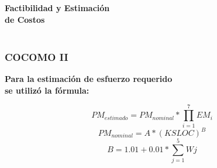\documentclass[xcolor=dvipsnames, xcolor=table]{beamer}
\begin{document}
\begin{frame}
    \centering\color{color3}{\rule{10cm}{5pt}}\\
    \vspace{-3mm}
    \centering\color{color3}{\rule{10cm}{1.5pt}}\\
    \vspace{2mm}
    \centering\textbf{\huge{\textcolor{color1}{Factibilidad y Estimación\\ de Costos}}}\\
    \centering\color{color3}{\rule{10cm}{1.5pt}}\\
\end{frame}

\begin{frame}
    \frametitle{COCOMO II}
    \centering\textbf{\textcolor{color3}{Para la estimación de esfuerzo requerido\\se utilizó la fórmula:}}

\[PM_{estimado} = PM_{nominal} * \prod_{i=1}^{7}EM_{i}\]
\[PM_{nominal} = A * (KSLOC)^{B}\]
\[B = 1.01 + 0.01 * \sum_{j=1}^{5}Wj\]
\end{frame}
\end{document}
